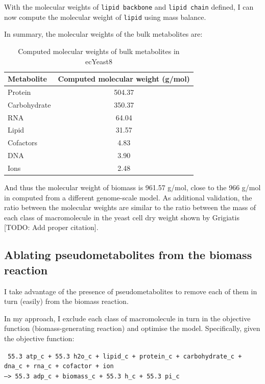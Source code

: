 With the molecular weights of \texttt{lipid backbone} and \texttt{lipid chain} defined, I can now compute the molecular weight of \texttt{lipid} using mass balance.

In summary, the molecular weights of the bulk metabolites are:
\begin{table}[ht]
  \centering
  \begin{tabular}{lS}
    Metabolite & {Computed molecular weight (g/mol)} \\
    \hline
    Protein & 504.37 \\
    Carbohydrate & 350.37 \\
    RNA & 64.04 \\
    Lipid & 31.57 \\
    Cofactors & 4.83 \\
    DNA & 3.90 \\
    Ions & 2.48
  \end{tabular}
  \caption{Computed molecular weights of bulk metabolites in ecYeast8}
  \label{tab:ecyeast8-mol-weights}
\end{table}

And thus the molecular weight of biomass is 961.57 g/mol, close to the 966 g/mol in \textcite{takhaveevTemporalSegregationBiosynthetic2023} computed from a different genome-scale model.
As additional validation, the ratio between the molecular weights are similar to the ratio between the mass of each class of macromolecule in the yeast cell dry weight shown by Grigiatis [TODO: Add proper citation].

\subsection{Ablating pseudometabolites from the biomass reaction}
\label{subsec:model-yeast8-pseudometabolites}

I take advantage of the presence of pseudometabolites to remove each of them in turn (easily) from the biomass reaction.

In my approach, I exclude each class of macromolecule in turn in the objective function (biomass-generating reaction) and optimise the model.
Specifically, given the objective function:

\texttt{
  55.3 atp\_c + 55.3 h2o\_c + lipid\_c + protein\_c + carbohydrate\_c + dna\_c + rna\_c + cofactor + ion \\
  --> 55.3 adp\_c + biomass\_c + 55.3 h\_c + 55.3 pi\_c
}

